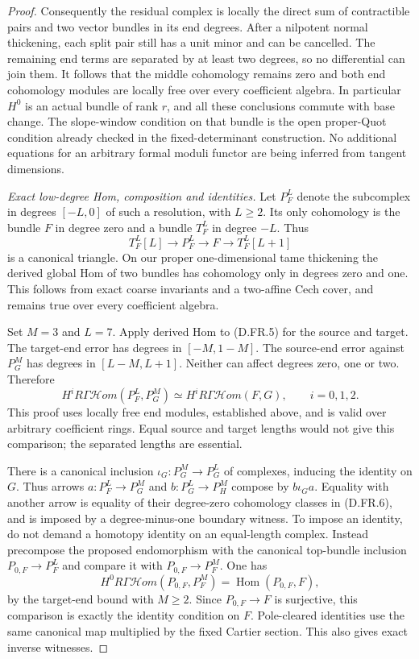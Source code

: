 \begin{proof}
Consequently the residual complex is locally the direct
sum of contractible pairs and two vector bundles in its
end degrees. After a nilpotent normal thickening, each
split pair still has a unit minor and can be cancelled.
The remaining end terms are separated by at least two
degrees, so no differential can join them. It follows
that the middle cohomology remains zero and both end
cohomology modules are locally free over every
coefficient algebra. In particular $H^0$ is an actual
bundle of rank $r$, and all these conclusions commute
with base change. The slope-window condition on that
bundle is the open proper-Quot condition already checked
in the fixed-determinant construction. No additional
equations for an arbitrary formal moduli functor are
being inferred from tangent dimensions.

\emph{Exact low-degree Hom, composition and identities.}
Let $P^L_F$ denote the subcomplex in degrees $[-L,0]$
of such a resolution, with $L\geq2$. Its only
cohomology is the bundle $F$ in degree zero and a
bundle $T_F^L$ in degree $-L$. Thus
\[
 T_F^L[L]\longrightarrow P_F^L\longrightarrow F
                   \longrightarrow T_F^L[L+1]         \tag{D.FR.5}
\]
is a canonical triangle. On our proper one-dimensional
tame thickening the derived global Hom of two bundles
has cohomology only in degrees zero and one. This
follows from exact coarse invariants and a two-affine
Cech cover, and remains true over every coefficient
algebra.

Set $M=3$ and $L=7$. Apply derived Hom to (D.FR.5)
for the source and target. The target-end error has
degrees in $[-M,1-M]$. The source-end error against
$P_G^M$ has degrees in $[L-M,L+1]$. Neither can
affect degrees zero, one or two. Therefore
\[
 H^iR\Gamma\mathcal Hom(P_F^L,P_G^M)
       \simeq H^iR\Gamma\mathcal Hom(F,G),
                       \qquad i=0,1,2.                \tag{D.FR.6}
\]
This proof uses locally free end modules, established
above, and is valid over arbitrary coefficient rings.
Equal source and target lengths would not give this
comparison; the separated lengths are essential.

There is a canonical inclusion $\iota_G:P_G^M\to P_G^L$
of complexes, inducing the identity on $G$. Thus arrows
$a:P_F^L\to P_G^M$ and $b:P_G^L\to P_H^M$ compose
by $b\iota_G a$. Equality with another arrow is equality
of their degree-zero cohomology classes in (D.FR.6),
and is imposed by a degree-minus-one boundary witness.
To impose an identity, do not demand a homotopy identity
on an equal-length complex. Instead precompose the
proposed endomorphism with the canonical top-bundle
inclusion $P_{0,F}\to P_F^L$ and compare it with
$P_{0,F}\to P_F^M$. One has
\[
 H^0R\Gamma\mathcal Hom(P_{0,F},P_F^M)
                         =\operatorname{Hom}(P_{0,F},F),
                                                        \tag{D.FR.7}
\]
by the target-end bound with $M\geq2$. Since
$P_{0,F}\to F$ is surjective, this comparison is exactly
the identity condition on $F$. Pole-cleared identities
use the same canonical map multiplied by the fixed
Cartier section. This also gives exact inverse witnesses.


\end{proof}
